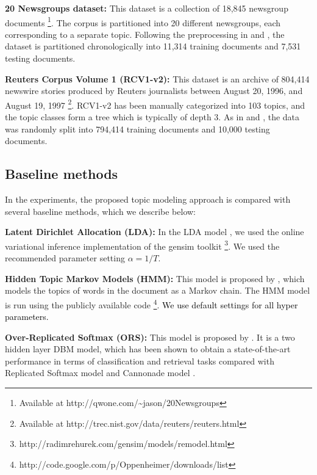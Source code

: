 \documentclass[english,letter]{article}
\renewcommand\[{\begin{equation}}
\renewcommand\]{\end{equation}}
\begin{document}
\noindent \textbf{20 Newsgroups dataset: }This dataset is a collection
of 18,845 newsgroup documents%
\footnote{Available at http://qwone.com/\textasciitilde{}jason/20Newsgroups%
}. The corpus is partitioned into 20 different newsgroups, each corresponding
to a separate topic. Following the preprocessing in \cite{hinton2009replicated}
and \cite{larochelle2012neural}, the dataset is partitioned chronologically
into 11,314 training documents and 7,531 testing documents.

\noindent \textbf{Reuters Corpus Volume 1 (RCV1-v2):} This dataset
is an archive of 804,414 newswire stories produced by Reuters journalists
between August 20, 1996, and August 19, 1997 \cite{lewis2004rcv1}%
\footnote{Available at http://trec.nist.gov/data/reuters/reuters.html%
}. RCV1-v2 has been manually categorized into 103 topics, and the topic
classes form a tree which is typically of depth 3. As in \cite{hinton2009replicated}
and \cite{larochelle2012neural}, the data was randomly split into
794,414 training documents and 10,000 testing documents.


\subsection{Baseline methods}

In the experiments, the proposed topic modeling approach is compared
with several baseline methods, which we describe below:

\noindent \textbf{Latent Dirichlet Allocation (LDA):} In the LDA model
\cite{blei2003latent}, we used the online variational inference implementation
of the gensim toolkit %
\footnote{http://radimrehurek.com/gensim/models/remodel.html%
}. We used the recommended parameter setting $\alpha=1/T$.

\noindent \textbf{Hidden Topic Markov Models (HMM):} This model is
proposed by \cite{gruber2007hidden}, which models the topics of words
in the document as a Markov chain. The HMM model is run using the
publicly available code%
\footnote{http://code.google.com/p/Oppenheimer/downloads/list%
}. \textcolor{black}{We use default settings for all hyper parameters.}

\noindent \textbf{Over-Replicated Softmax (ORS):} This model is proposed
by \cite{srivastava2013modeling}. It is a two hidden layer DBM model,
which has been shown to obtain a state-of-the-art performance in terms
of classification and retrieval tasks compared with Replicated Softmax
model \cite{hinton2009replicated} and Cannonade model \cite{larochelle2012neural}.
\end{document}
